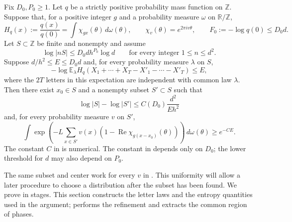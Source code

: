 \begin{lemma}
\label{lemma:compression}
Fix $D_0,P_0\ge1$.  Let $q$ be a strictly positive probability mass function
on $\mathbb Z$.  Suppose that, for a positive integer $g$ and a probability
measure $\omega$ on $\mathbb R/\mathbb Z$,
\begin{equation}
\label{entropy-foundations:characteristic}
 H_q(x):=\frac{q(x)}{q(0)}
   =\int\chi_{gx}(\theta)\,d\omega(\theta),\qquad
 \chi_v(\theta)=e^{2\pi i v\theta},\qquad
 F_0:=-\log q(0)\le D_0d.
\end{equation}
Let $S\subset\mathbb Z$ be finite and nonempty and assume
\begin{equation}
\label{entropy-foundations:sumset-hypothesis}
 \log|nS|\le D_0d h^{P_0}\log d
 \qquad\text{for every integer }1\le n\le d^2.
\end{equation}
Suppose $d/h^2\le E\le D_0d$ and, for every probability measure $\lambda$
on $S$,
\begin{equation}
\label{entropy-foundations:moment-hypothesis}
 -\log\mathbb E_\lambda
 H_q(X_1+\cdots+X_T-X'_1-\cdots-X'_T)\le E,
\end{equation}
where the $2T$ letters in this expectation are independent with common law
$\lambda$.  Then there exist $x_0\in S$ and a nonempty subset $S'\subset S$
such that
\begin{equation}
\label{entropy-foundations:size-conclusion}
 \log|S|-\log|S'|\le C(D_0)\frac{d^2}{Eh^2}
\end{equation}
and, for every probability measure $v$ on $S'$,
\begin{equation}
\label{entropy-foundations:volume-conclusion}
 \int\exp\!\left(
   -L\sum_{x\in S'}v(x)
          (1-\operatorname{Re}\chi_{g(x-x_0)}(\theta))
              \right)\,d\omega(\theta)\ge e^{-CE}.
\end{equation}
The constant $C$ in  is
numerical.  The constant in 
depends only on $D_0$; the lower threshold for $d$ may also depend on $P_0$.
\end{lemma}

The same subset and center work for every $v$ in
.  This uniformity will allow a
later procedure to choose a distribution after the subset has been found.
We prove  in stages.  This section constructs the
letter laws and the entropy quantities used in the argument;
 performs the refinement and extracts the
common region of phases.

